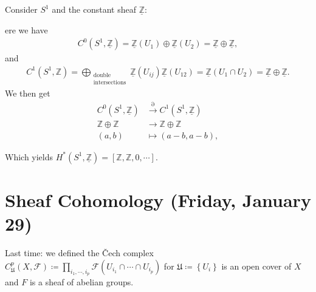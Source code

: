 \begin{example}[?]

Consider \(S^1\) and the constant sheaf \(\underline{{\mathbb{Z}}}\):

\begin{figure}
\centering
{}
\end{figure}

ere we have
\begin{align*}
C^0(S^1, \underline{{\mathbb{Z}}}) = \underline{{\mathbb{Z}}}(U_1) \oplus \underline{{\mathbb{Z}}}(U_2) = \underline{{\mathbb{Z}}} \oplus \underline{{\mathbb{Z}}}
,\end{align*}
and
\begin{align*}
C^1(S^1, {\mathbb{Z}}) = \bigoplus_{\substack{ \text{double} \\ \text{intersections}} } \underline{{\mathbb{Z}}}(U_{ij})  \underline{{\mathbb{Z}}}(U_{12}) = \underline{{\mathbb{Z}}}(U_1 \cap U_{2}) = \underline{{\mathbb{Z}}} \oplus \underline{{\mathbb{Z}}}
.\end{align*}
We then get
\begin{align*}
C^0(S^1, \underline{{\mathbb{Z}}}) &\xrightarrow{{{\partial}}} C^1(S^1, \underline{{\mathbb{Z}}}) \\
{\mathbb{Z}}\oplus {\mathbb{Z}}&\to {\mathbb{Z}}\oplus {\mathbb{Z}}\\
(a, b) &\mapsto (a-b, a-b)
,\end{align*}

Which yields
\(H^*(S^1, \underline{{\mathbb{Z}}}) = [{\mathbb{Z}}, {\mathbb{Z}}, 0, \cdots]\).

\end{example}

\hypertarget{sheaf-cohomology-friday-january-29}{%
\section{Sheaf Cohomology (Friday, January
29)}\label{sheaf-cohomology-friday-january-29}}

Last time: we defined the Čech complex
\(C_{\mathfrak{U} }^p(X, \mathcal{F} ) \coloneqq\prod_{i_1, \cdots, i_p} \mathcal{F} (U_{i_1} \cap\cdots \cap U_{i_p})\)
for \(\mathfrak{U}\coloneqq\left\{{U_i}\right\}\) is an open cover of
\(X\) and \(F\) is a sheaf of abelian groups.

